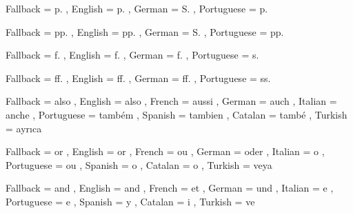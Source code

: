   {
    Fallback   = p. ,
    English    = p. ,
    German     = S. ,
    Portuguese = p.
  }

  {
    Fallback   = pp. ,
    English    = pp. ,
    German     = S. ,
    Portuguese = pp.
  }

  {
    Fallback   = f. ,
    English    = f. ,
    German     = f. ,
    Portuguese = s.
  }

  {
    Fallback   = ff. ,
    English    = ff. ,
    German     = ff. ,
    Portuguese = ss.
  }

  {
    Fallback   = also ,
    English    = also ,
    French     = aussi ,
    German     = auch ,
    Italian    = anche ,
    Portuguese = tamb\'{e}m ,
    Spanish    = tambien ,
    Catalan    = tamb\'{e} ,
    Turkish    = ayr\i ca
  }

  {
    Fallback   = or ,
    English    = or ,
    French     = ou ,
    German     = oder ,
    Italian    = o ,
    Portuguese = ou ,
    Spanish    = o ,
    Catalan    = o ,
    Turkish    = veya
  }

  {
    Fallback   = and ,
    English    = and ,
    French     = et ,
    German     = und ,
    Italian    = e ,
    Portuguese = e ,
    Spanish    = y ,
    Catalan    = i ,
    Turkish    = ve
  }

\AcroModuleEnd
